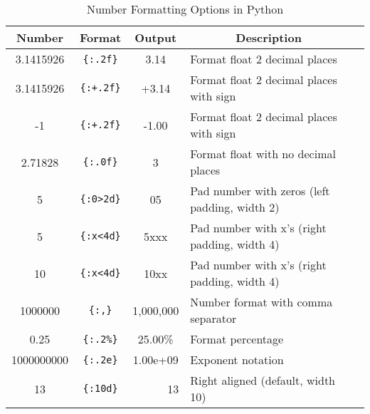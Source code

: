 \documentclass[a4paper,11pt]{book}
\begin{document}
\begin{table}[!htbp]
	\centering
	\caption{Number Formatting Options in Python}
	\label{tab:number_formatting}
	\begin{tabular}{cccll}
		\toprule \toprule
		\multicolumn{1}{c}{Number} &
		\multicolumn{1}{c}{Format} & 
		\multicolumn{1}{c}{Output} & 
		\multicolumn{1}{c}{Description} \\
		\midrule
		3.1415926                           & \texttt{\{:.2f\}}                            & 3.14                                & Format float 2 decimal places                 &  \\
		3.1415926                           & \texttt{\{:+.2f\}}                           & +3.14                               & Format float 2 decimal places with sign       &  \\
		-1                                  & \texttt{\{:+.2f\}}}                           & -1.00                               & Format float 2 decimal places with sign       &  \\
		2.71828                             & \texttt{\{:.0f\}}                            & 3                                   & Format float with no decimal places           &  \\
		5                                   & \texttt{\{:0\textgreater{}2d\}}              & 05                                  & Pad number with zeros (left padding, width 2) &  \\
		5                                   & \texttt{\{:x\textless{}4d\}}                 & 5xxx                                & Pad number with x’s (right padding, width 4)  &  \\
		10                                  & \texttt{\{:x\textless{}4d\}}                 & 10xx                                & Pad number with x’s (right padding, width 4)  &  \\
		1000000                             & \texttt{\{:,\}}                              & 1,000,000                           & Number format with comma separator            &  \\
		0.25                                & \texttt{\{:.2\%\}}                           & 25.00\%                             & Format percentage                             &  \\
		1000000000                          & \texttt{\{:.2e\}}                            & 1.00e+09                            & Exponent notation                             &  \\
		13                                  & \texttt{\{:10d\}}                            & \multicolumn{1}{r}{13}                                  & Right aligned (default, width 10)             &  \\

\end{tabular}
\end{table}
\end{document}
